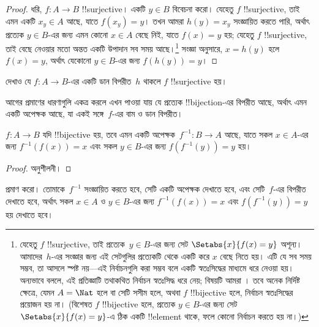 \documentclass[../../../include/open-logic-section]{subfiles}
\begin{document}
\begin{proof}
ধরি, $f\colon A \to B$ !!{surjective}। একটি $y \in
B$ বিবেচনা করো। যেহেতু $f$ !!{surjective}, তাই এমন একটি $x_y \in A$ আছে, যাতে $f(x_y)
= y$। তখন আমরা $h(y) = x_y$ সংজ্ঞায়িত করতে পারি, অর্থাৎ প্রত্যেক $y \in B$-এর জন্য এমন কোনো $x \in A$ বেছে নিই, যাতে $f(x) = y$ হয়; যেহেতু $f$ !!{surjective}, তাই বেছে নেওয়ার মতো অন্তত একটি উপাদান সব সময় আছে।\footnote{যেহেতু $f$ !!{surjective}, তাই প্রত্যেক~$y \in B$-এর জন্য সেট $\Setabs{x}{f(x) = y}$ অশূন্য। আমাদের~$h$-এর সংজ্ঞার জন্য এই সেটগুলির প্রত্যেকটি থেকে একটি করে $x$ বেছে নিতে হয়। এটি যে সব সময় সম্ভব, তা আসলে স্পষ্ট নয়—এই নির্বাচনগুলি করা সম্ভব বলে একটি স্বতঃসিদ্ধের মাধ্যমে ধরে নেওয়া হয়। অন্যভাবে বললে, এই প্রতিজ্ঞাটি তথাকথিত নির্বাচন স্বতঃসিদ্ধ ধরে নেয়; বিষয়টি আমরা । তবে অনেক নির্দিষ্ট ক্ষেত্রে, যেমন $A = \Nat$ হলে বা সেটি সসীম হলে, অথবা $f$ !!{bijective} হলে, নির্বাচন স্বতঃসিদ্ধের প্রয়োজন হয় না। (বিশেষত $f$ !!{bijective} হলে, প্রত্যেক $y \in B$-এর জন্য সেট $\Setabs{x}{f(x) = y}$-এ ঠিক একটি !!{element} থাকে, ফলে কোনো নির্বাচন করতে হয় না।)} সংজ্ঞা অনুসারে, $x = h(y)$ হলে $f(x) = y$, অর্থাৎ যেকোনো $y \in B$-এর জন্য $f(h(y)) = y$।
\end{proof}

\begin{prob}
দেখাও যে $f\colon A \to B$-এর একটি ডান বিপরীত~$h$ থাকলে $f$ !!{surjective} হয়।
\end{prob}

\begin{explain}
  আগের প্রমাণের ধারণাগুলি একত্র করলে এখন পাওয়া যায় যে প্রত্যেক !!{bijection}-এর বিপরীত আছে, অর্থাৎ এমন একটি অপেক্ষক আছে, যা একই সঙ্গে~$f$-এর বাম ও ডান বিপরীত।
\end{explain}

\begin{prop}
$f\colon A \to B$ যদি !!{bijective} হয়, তবে এমন একটি অপেক্ষক~$f^{-1}\colon B \to A$ আছে, যাতে সকল $x \in A$-এর জন্য $f^{-1}(f(x)) = x$ এবং সকল $y \in B$-এর জন্য $f(f^{-1}(y)) = y$ হয়।
\end{prop}

\begin{proof}
অনুশীলনী।
\end{proof}

\begin{prob}
 প্রমাণ করো। তোমাকে~$f^{-1}$ সংজ্ঞায়িত করতে হবে, সেটি একটি অপেক্ষক দেখাতে হবে, এবং সেটি~$f$-এর বিপরীত দেখাতে হবে, অর্থাৎ সকল $x \in A$ ও $y \in B$-এর জন্য $f^{-1}(f(x)) = x$ এবং $f(f^{-1}(y)) = y$ হয় দেখাতে হবে।
\end{prob}
\end{document}
